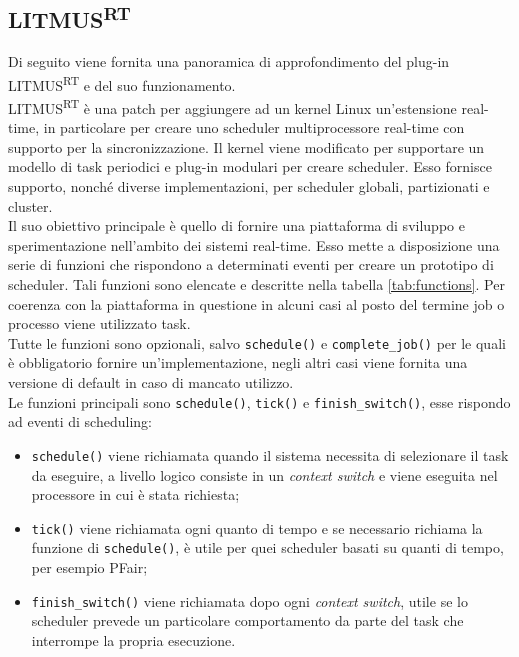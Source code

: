 \begin{appendices}

\chapter{LITMUS\textsuperscript{RT}}
\label{sec:litmus}

Di seguito viene fornita una panoramica di approfondimento del plug-in LITMUS\textsuperscript{RT} e del suo funzionamento.\\

LITMUS\textsuperscript{RT} è una patch per aggiungere ad un kernel Linux un'estensione real-time, in particolare per creare uno scheduler multiprocessore real-time con supporto per la sincronizzazione. Il kernel viene modificato per supportare un modello di task periodici e plug-in modulari per creare scheduler. Esso fornisce supporto, nonché diverse implementazioni, per scheduler globali, partizionati e cluster.\\

Il suo obiettivo principale è quello di fornire una piattaforma di sviluppo e sperimentazione nell'ambito dei sistemi real-time. Esso mette a disposizione una serie di funzioni che rispondono a determinati eventi per creare un prototipo di scheduler. Tali funzioni sono elencate e descritte nella tabella \ref{tab:functions}. Per coerenza con la piattaforma in questione in alcuni casi al posto del termine job o processo viene utilizzato task.\\

Tutte le funzioni sono opzionali, salvo \texttt{schedule()} e \texttt{complete\_job()} per le quali è obbligatorio fornire un'implementazione, negli altri casi viene fornita una versione di default in caso di mancato utilizzo.\\

Le funzioni principali sono \texttt{schedule()}, \texttt{tick()} e \texttt{finish\_switch()}, esse rispondo ad eventi di scheduling:\\

\begin{itemize}
	\item \texttt{schedule()} viene richiamata quando il sistema necessita di selezionare il task da eseguire, a livello logico consiste in un \textit{context switch} e viene eseguita nel processore in cui è stata richiesta;
	\item \texttt{tick()} viene richiamata ogni quanto di tempo e se necessario richiama la funzione di \texttt{schedule()}, è utile per quei scheduler basati su quanti di tempo, per esempio PFair;
	\item \texttt{finish\_switch()} viene richiamata dopo ogni \textit{context switch}, utile se lo scheduler prevede un particolare comportamento da parte del task che interrompe la propria esecuzione.\\
\end{itemize}


\end{appendices}
